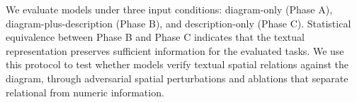 \documentclass[11pt]{article}
\begin{document}
We evaluate models under three input conditions: diagram-only (Phase A), diagram-plus-description (Phase B), and description-only (Phase C). Statistical equivalence between Phase B and Phase C indicates that the textual representation preserves sufficient information for the evaluated tasks. We use this protocol to test whether models verify textual spatial relations against the diagram, through adversarial spatial perturbations and ablations that separate relational from numeric information.


\end{document}
